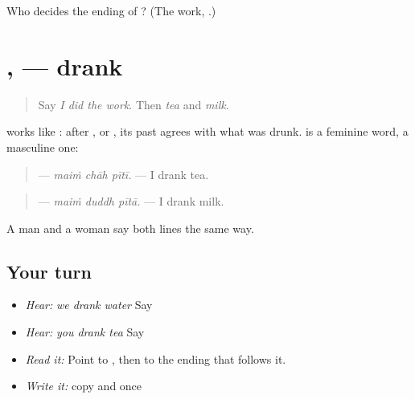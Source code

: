 \begin{tcolorbox}[breakable,colback=teal!4,colframe=teal!35!black,title={Before you move on}]
Who decides the ending of \textbf{}? (The work, \textbf{}.)
\end{tcolorbox}
\section[\texorpdfstring{\pa{ਪੀਤਾ} · \pa{ਪੀਤੀ} (pītā · pītī)}{ਪੀਤਾ · ਪੀਤੀ (pītā · pītī)}]{,  — drank}

\label{lesson:PA-C219-pita}



\begin{quote}
Say \emph{I did the work}. Then \emph{tea} and \emph{milk}.
\end{quote}

\begin{grammarlens}[title={Grammar Lens: the thing decides}]
\textbf{} works like \textbf{}: after \textbf{}, \textbf{} or \textbf{}, its past agrees with what was drunk. \textbf{} is a feminine word, \textbf{} a masculine one:

\begin{quote}
\textbf{  } — \emph{maiṁ chāh pītī.} — I drank tea.
\end{quote}

\begin{quote}
\textbf{  } — \emph{maiṁ duddh pītā.} — I drank milk.
\end{quote}

A man and a woman say both lines the same way.
\end{grammarlens}

\subsection*{Your turn}
\begin{itemize}
\raggedright
  \item \emph{Hear:} \emph{we drank water} Say \textbf{  }
  \item \emph{Hear:} \emph{you drank tea} Say \textbf{  }
  \item \emph{Read it:} \textbf{  } Point to \textbf{}, then to the ending that follows it.
  \item \emph{Write it:} copy \textbf{} and \textbf{} once
\end{itemize}

